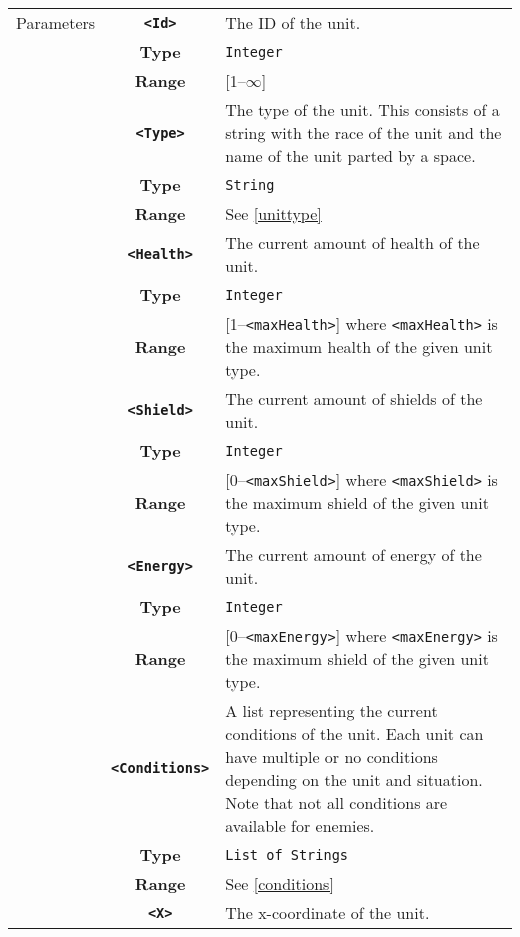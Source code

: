  \begin{tabularx}{\textwidth}{l | c | p{8cm}|}
 \cline{2-3}
 Parameters & \textbf{\verb|<Id>|} & The ID of the unit.\\
            & \textbf{Type} & \verb|Integer| \\
            & \textbf{Range} & [1--$\infty$] \\
            \cline{2-3}
            & \textbf{\verb|<Type>|} & The type of the unit. This consists of a string with the race of the unit and the name of the unit parted by a space. \\
            & \textbf{Type} & \verb|String| \\
            & \textbf{Range} & See \ref{unittype} \\
            \cline{2-3}
            & \textbf{\verb|<Health>|} & The current amount of health of the unit.\\
            & \textbf{Type} & \verb|Integer| \\
            & \textbf{Range} & [1--\verb|<maxHealth>|] where \verb|<maxHealth>| is the maximum health of the given unit type.\\
            \cline{2-3}
            & \textbf{\verb|<Shield>|} & The current amount of shields of the unit. \\
            & \textbf{Type} & \verb|Integer| \\
            & \textbf{Range} & [0--\verb|<maxShield>|] where \verb|<maxShield>| is the maximum shield of the given unit type. \\
            \cline{2-3}
            & \textbf{\verb|<Energy>|} & The current amount of energy of the unit. \\
            & \textbf{Type} & \verb|Integer| \\
            & \textbf{Range} & [0--\verb|<maxEnergy>|] where \verb|<maxEnergy>| is the maximum shield of the given unit type. \\
            \cline{2-3}
            & \textbf{\verb|<Conditions>|} & A list representing the current conditions of the unit. Each unit can have multiple or no conditions depending on the unit and situation. Note that not all conditions are available for enemies.\\
            & \textbf{Type} & \verb|List of Strings| \\
            & \textbf{Range} & See \ref{conditions} \\
            \cline{2-3}
            & \textbf{\verb|<X>|} & The x-coordinate of the unit.\\

\end{tabularx}
